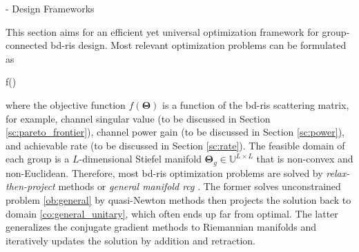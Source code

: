 \documentclass[journal]{IEEEtran}
\begin{document}
\begin{section}{- Design Frameworks}

	This section aims for an efficient yet universal optimization framework for group-connected \gls{bd}-\gls{ris} design.
	Most relevant optimization problems can be formulated as
	\begin{maxi!}
		{\scriptstyle{\mathbf{\Theta}}}{f(\mathbf{\Theta})}{\label{op:general}}{\label{ob:general}}
	\end{maxi!}
	where the objective function $f(\mathbf{\Theta})$ is a function of the \gls{bd}-\gls{ris} scattering matrix, for example, channel singular value (to be discussed in Section \ref{sc:pareto_frontier}), channel power gain (to be discussed in Section \ref{sc:power}), and achievable rate (to be discussed in Section \ref{sc:rate}).
	The feasible domain of each group is a $L$-dimensional Stiefel manifold $\mathbf{\Theta}_g \in \mathbb{U}^{L \times L}$ that is non-convex and non-Euclidean.
	Therefore, most \gls{bd}-\gls{ris} optimization problems are solved by \emph{relax-then-project} methods \cite{Fang2023} or \emph{general manifold \gls{rcg}} \cite{Li2023b,Li2023c,Zhou2023}.
	The former solves unconstrained problem \eqref{ob:general} by quasi-Newton methods then projects the solution back to domain \ref{co:general_unitary}, which often ends up far from optimal.
	The latter generalizes the conjugate gradient methods to Riemannian manifolds and iteratively updates the solution by addition and retraction.

\end{section}
\end{document}
